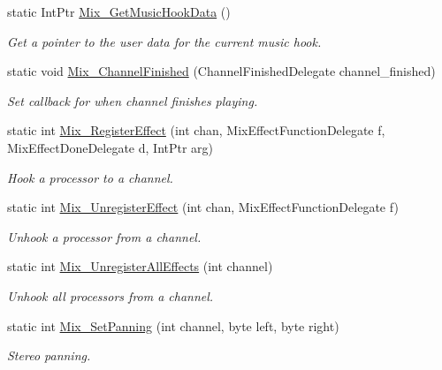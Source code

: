 \begin{DoxyCompactItemize}
static IntPtr \hyperlink{namespace_tao_1_1_sdl_ac7bebe18135733e318ef215389944542}{Mix\_\-GetMusicHookData} ()
\begin{DoxyCompactList}\small\item\em Get a pointer to the user data for the current music hook. \item\end{DoxyCompactList}\item 
static void \hyperlink{namespace_tao_1_1_sdl_a9ee8b67a7db7e1ec9f18b348497d24a2}{Mix\_\-ChannelFinished} (ChannelFinishedDelegate channel\_\-finished)
\begin{DoxyCompactList}\small\item\em Set callback for when channel finishes playing. \item\end{DoxyCompactList}\item 
static int \hyperlink{namespace_tao_1_1_sdl_a8d657c91edac10d18f474d27fc88fbb5}{Mix\_\-RegisterEffect} (int chan, MixEffectFunctionDelegate f, MixEffectDoneDelegate d, IntPtr arg)
\begin{DoxyCompactList}\small\item\em Hook a processor to a channel. \item\end{DoxyCompactList}\item 
static int \hyperlink{namespace_tao_1_1_sdl_ab5415c4259b9c044b48a59d0a4548f26}{Mix\_\-UnregisterEffect} (int chan, MixEffectFunctionDelegate f)
\begin{DoxyCompactList}\small\item\em Unhook a processor from a channel. \item\end{DoxyCompactList}\item 
static int \hyperlink{namespace_tao_1_1_sdl_a68ba0a9948d37fa891d61b1ed2c50af9}{Mix\_\-UnregisterAllEffects} (int channel)
\begin{DoxyCompactList}\small\item\em Unhook all processors from a channel. \item\end{DoxyCompactList}\item 
static int \hyperlink{namespace_tao_1_1_sdl_ad00800cc3f606ac7ef9bec6b7413ad85}{Mix\_\-SetPanning} (int channel, byte left, byte right)
\begin{DoxyCompactList}\small\item\em Stereo panning. \item\end{DoxyCompactList}\item 

\end{DoxyCompactItemize}
